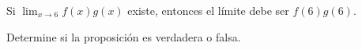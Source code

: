 \item Si $\lim_{x \to 6} f(x) g(x)$ existe, entonces el límite debe ser $f(6) g(6)$.
\par
Determine si la proposición es verdadera o falsa.

